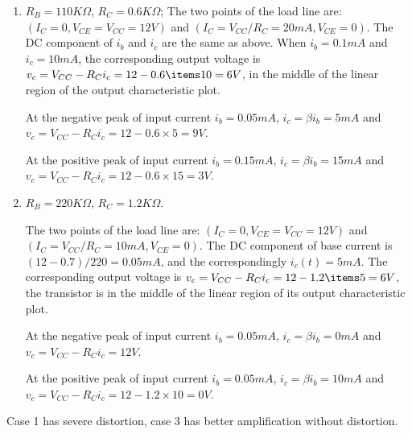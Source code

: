 \begin{enumerate}
\begin{enumerate}
\item $R_B=110 K\Omega$, $R_C=0.6 K\Omega$;
The two points of the load line are:
$(I_C=0, V_{CE}=V_{CC}=12V)$ and $(I_C=V_{CC}/R_C=20 mA, V_{CE}=0)$.
The DC component of $i_b$ and $i_c$ are the same as above.
When $i_b=0.1 mA$ and $i_c=10 mA$, the corresponding output voltage
is $v_c=V_{CC}-R_C i_c=12 - 0.6\items 10=6 V$, in the middle of the linear
region of the output characteristic plot.

At the negative peak of input current $i_b=0.05 mA$, 
$i_c=\beta i_b=5 mA$ and $v_c=V_{CC}-R_C i_c=12-0.6\times 5=9V$. 

At the positive peak of input current $i_b=0.15 mA$, 
$i_c=\beta i_b=15 mA$ and $v_c=V_{CC}-R_C i_c=12-0.6\times 15=3V$. 

\item $R_B=220 K\Omega$, $R_C=1.2 K\Omega$.

The two points of the load line are:
$(I_C=0, V_{CE}=V_{CC}=12V)$ and $(I_C=V_{CC}/R_C=10 mA, V_{CE}=0)$.
The DC component of base current is $(12-0.7)/220=0.05 mA$, and the
correspondingly $i_c(t)=5 mA$. The corresponding output voltage is 
$v_c=V_{CC}-R_C i_c=12 - 1.2\items 5=6 V$, the transistor is in the
middle of the linear region of its output characteristic plot. 

At the negative peak of input current $i_b=0.05 mA$, 
$i_c=\beta i_b=0 mA$ and $v_c=V_{CC}-R_C i_c=12V$. 

At the positive peak of input current $i_b=0.05 mA$, 
$i_c=\beta i_b=10 mA$ and $v_c=V_{CC}-R_C i_c=12-1.2\times 10=0V$. 

\end{enumerate}
Case 1 has severe distortion, case 3 has better amplification without
distortion.


\end{enumerate}



